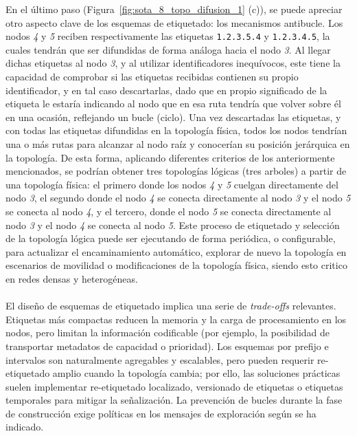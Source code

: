 En el último paso (Figura~\ref{fig:sota_8_topo_difusion_1} (c)), se puede apreciar otro aspecto clave de los esquemas de etiquetado: los mecanismos antibucle. Los nodos \textit{4} y \textit{5} reciben respectivamente las etiquetas \texttt{1.2.3.5.4} y \texttt{1.2.3.4.5}, la cuales tendrán que ser difundidas de forma análoga hacia el nodo \textit{3}. Al llegar dichas etiquetas al nodo \textit{3}, y al utilizar identificadores inequívocos, este tiene la capacidad de comprobar si las etiquetas recibidas contienen su propio identificador, y en tal caso descartarlas, dado que en propio significado de la etiqueta le estaría indicando al nodo que en esa ruta tendría que volver sobre él en una ocasión, reflejando un bucle (ciclo). Una vez descartadas las etiquetas, y con todas las etiquetas difundidas en la topología física, todos los nodos tendrían una o más rutas para alcanzar al nodo raíz y conocerían su posición jerárquica en la topología. De esta forma, aplicando diferentes criterios de los anteriormente mencionados, se podrían obtener tres topologías lógicas (tres arboles) a partir de una topología física: el primero donde los nodos \textit{4} y \textit{5} cuelgan directamente del nodo \textit{3}, el segundo donde el nodo \textit{4} se conecta directamente al nodo \textit{3} y el nodo \textit{5} se conecta al nodo \textit{4}, y el tercero, donde el nodo \textit{5} se conecta directamente al nodo \textit{3} y el nodo \textit{4} se conecta al nodo \textit{5}. Este proceso de etiquetado y selección de la topología lógica puede ser ejecutando de forma periódica, o configurable, para actualizar el encaminamiento automático, explorar de nuevo la topología en escenarios de movilidad o modificaciones de la topología física, siendo esto critico en redes densas y heterogéneas.\\
\\
El diseño de esquemas de etiquetado implica una serie de \textit{trade-offs} relevantes. Etiquetas más compactas reducen la memoria y la carga de procesamiento en los nodos, pero limitan la información codificable (por ejemplo, la posibilidad de transportar metadatos de capacidad o prioridad). Los esquemas por prefijo e intervalos son naturalmente agregables y escalables, pero pueden requerir re-etiquetado amplio cuando la topología cambia; por ello, las soluciones prácticas suelen implementar re-etiquetado localizado, versionado de etiquetas o etiquetas temporales para mitigar la señalización. La prevención de bucles durante la fase de construcción exige políticas en los mensajes de exploración según se ha indicado.\\
